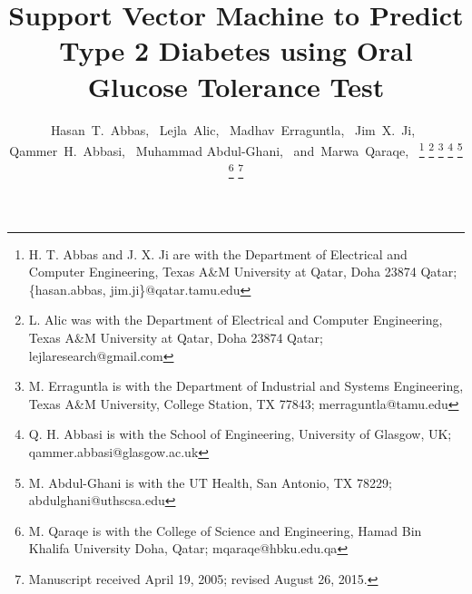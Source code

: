 \documentclass[journal,comsoc]{IEEEtran}
\renewcommand{\^}{\hat}  %
\begin{document}
%
\title{Support Vector Machine to Predict Type 2 Diabetes using Oral Glucose Tolerance Test}
%
%

\author{Hasan~T.~Abbas,~
Lejla~Alic,~
Madhav~Erraguntla,~
Jim~X.~Ji,~
Qammer~H.~Abbasi,~
Muhammad Abdul-Ghani,~
and~Marwa~Qaraqe,~%
\thanks{H. T. Abbas and J. X. Ji are with the Department
of Electrical and Computer Engineering, Texas A\&M University at Qatar, Doha 23874 Qatar;  \{hasan.abbas, jim.ji\}@qatar.tamu.edu}%
\thanks{L. Alic was with the Department
of Electrical and Computer Engineering, Texas A\&M University at Qatar, Doha 23874 Qatar; lejlaresearch@gmail.com}%
\thanks{M. Erraguntla is with the Department of Industrial and Systems Engineering, Texas A\&M University, College Station, TX 77843; merraguntla@tamu.edu}%
\thanks{Q. H. Abbasi is with the School of Engineering, University of Glasgow, UK; qammer.abbasi@glasgow.ac.uk}%
\thanks{M. Abdul-Ghani is with the UT Health, San Antonio, TX 78229; abdulghani@uthscsa.edu}%
\thanks{M. Qaraqe is with the College of Science and Engineering, Hamad Bin Khalifa University Doha, Qatar; mqaraqe@hbku.edu.qa}%
\thanks{Manuscript received April 19, 2005; revised August 26, 2015.}}

%
%
\end{document}
